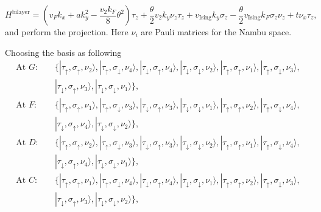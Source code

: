 \begin{subappendices}
				\begin{equation}\label{bilayer Hamiltonian in Nambu}
					H^{\text{bilayer}}=\left(v_F k_x+ak_y^2-\dfrac{v_2 k_F}{8}\theta^2\right)\tau_z+\dfrac{\theta}{2}v_2k_y\nu_z\tau_z+v_{\text{Ising}} k_y\sigma_z-\dfrac{\theta}{2}v_{\text{Ising}} k_F\sigma_z\nu_z+t\nu_x\tau_z,
				\end{equation}
				and perform the projection. Here $\nu_i$ are Pauli matrices for the Nambu space.\par
				Choosing the basis as following
				\begin{align*}
					\text{At }G:&\quad \{|\tau_\uparrow,\sigma_\uparrow,\nu_2\rangle,|\tau_\uparrow,\sigma_\downarrow,\nu_4\rangle,|\tau_\downarrow,\sigma_\uparrow,\nu_4\rangle,|\tau_\downarrow,\sigma_\downarrow,\nu_2\rangle, |\tau_\uparrow,\sigma_\uparrow,\nu_1\rangle,|\tau_\uparrow,\sigma_\downarrow,\nu_3\rangle,\\
                    &\quad|\tau_\downarrow,\sigma_\uparrow,\nu_3\rangle,|\tau_\downarrow,\sigma_\downarrow,\nu_1\rangle\},\\
					\text{At }F:&\quad \{|\tau_\uparrow,\sigma_\uparrow,\nu_1\rangle,|\tau_\uparrow,\sigma_\downarrow,\nu_3\rangle,|\tau_\downarrow,\sigma_\uparrow,\nu_3\rangle,|\tau_\downarrow,\sigma_\downarrow,\nu_1\rangle,|\tau_\uparrow,\sigma_\uparrow,\nu_2\rangle,|\tau_\uparrow,\sigma_\downarrow,\nu_4\rangle,\\
                    &\quad|\tau_\downarrow,\sigma_\uparrow,\nu_4\rangle,|\tau_\downarrow,\sigma_\downarrow,\nu_2\rangle\},\\
					\text{At }D:&\quad \{|\tau_\uparrow,\sigma_\uparrow,\nu_2\rangle,|\tau_\uparrow,\sigma_\downarrow,\nu_3\rangle,|\tau_\downarrow,\sigma_\uparrow,\nu_3\rangle,|\tau_\downarrow,\sigma_\downarrow,\nu_2\rangle,|\tau_\uparrow,\sigma_\uparrow,\nu_1\rangle,|\tau_\uparrow,\sigma_\downarrow,\nu_4\rangle,\\
                    &\quad|\tau_\downarrow,\sigma_\uparrow,\nu_4\rangle,|\tau_\downarrow,\sigma_\downarrow,\nu_1\rangle\},\\
					\text{At }C:&\quad \{|\tau_\uparrow,\sigma_\uparrow,\nu_1\rangle,|\tau_\uparrow,\sigma_\downarrow,\nu_4\rangle,|\tau_\downarrow,\sigma_\uparrow,\nu_4\rangle,|\tau_\downarrow,\sigma_\downarrow,\nu_1\rangle,|\tau_\uparrow,\sigma_\uparrow,\nu_2\rangle,|\tau_\uparrow,\sigma_\downarrow,\nu_3\rangle,\\
                    &\quad|\tau_\downarrow,\sigma_\uparrow,\nu_3\rangle,|\tau_\downarrow,\sigma_\downarrow,\nu_2\rangle\},
				\end{align*}

\end{subappendices}
